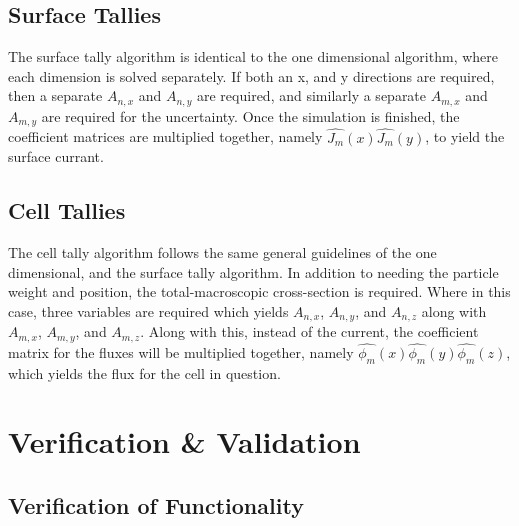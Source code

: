 \documentclass[10tma4paper]{article}
\begin{document}
\subsection{Surface Tallies}\label{Surface}
The surface tally algorithm is identical to the one dimensional algorithm, where each dimension is solved separately. If both an x, and y directions are required, then a separate $A_{n,x}$ and $A_{n,y}$ are required, and similarly a separate $A_{m,x}$ and $A_{m,y}$ are required for the uncertainty. Once the simulation is finished, the coefficient matrices are multiplied together, namely  $\hat{J_{m}}(x)\hat{J_{m}}(y)$, to yield the surface currant.

\subsection{Cell Tallies}\label{Collision}

The cell tally algorithm follows the same general guidelines of the one dimensional, and the surface tally algorithm. In addition to needing the particle weight and position, the total-macroscopic cross-section is required. Where in this case, three variables are required which yields $A_{n,x}$, $A_{n,y}$, and $A_{n,z}$ along with $A_{m,x}$, $A_{m,y}$, and $A_{m,z}$. Along with this, instead of the current, the coefficient matrix for the fluxes will be multiplied together, namely $\hat{\phi_{m}}(x)\hat{\phi_{m}}(y)\hat{\phi_{m}}(z)$, which yields the flux for the cell in question.

\section{Verification \& Validation}\label{vv}
\subsection{Verification of Functionality}\label{P1}
\end{document}
